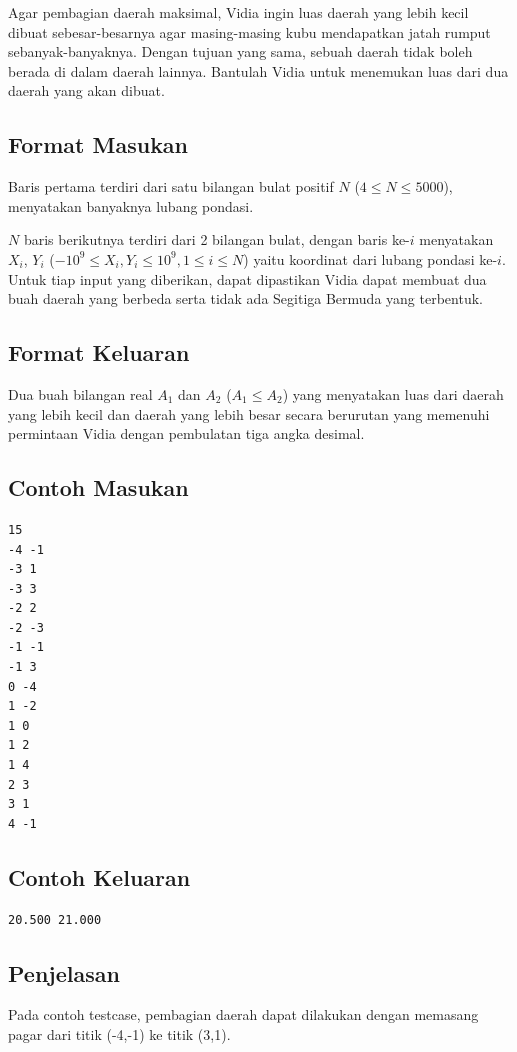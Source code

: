\documentclass{article}
\begin{document}
Agar pembagian daerah maksimal, Vidia ingin luas daerah yang lebih kecil dibuat sebesar-besarnya agar masing-masing kubu mendapatkan jatah rumput sebanyak-banyaknya. Dengan tujuan yang sama, sebuah daerah tidak boleh berada di dalam daerah lainnya. Bantulah Vidia untuk menemukan luas dari dua daerah yang akan dibuat.

\subsection*{Format Masukan}
Baris pertama terdiri dari satu bilangan bulat positif $N$ ($4 \leq N \leq 5000$), menyatakan banyaknya lubang pondasi.

$N$ baris berikutnya terdiri dari 2 bilangan bulat, dengan baris ke-$i$ menyatakan $X_i$, $Y_i$ ($-10^9 \leq X_i, Y_i \leq 10^9, 1 \leq i \leq N$) yaitu koordinat dari lubang pondasi ke-$i$. Untuk tiap input yang diberikan, dapat dipastikan Vidia dapat membuat dua buah daerah yang berbeda serta tidak ada Segitiga Bermuda yang terbentuk.

\subsection*{Format Keluaran}
Dua buah bilangan real $A_1$ dan $A_2$ ($A_1 \leq A_2$) yang menyatakan luas dari daerah yang lebih kecil dan daerah yang lebih besar secara berurutan yang memenuhi permintaan Vidia dengan pembulatan tiga angka desimal. 

\pagebreak
\begin{multicols}{2}
\subsection*{Contoh Masukan}
\begin{lstlisting}
15
-4 -1
-3 1
-3 3
-2 2
-2 -3
-1 -1
-1 3
0 -4
1 -2
1 0
1 2
1 4
2 3
3 1
4 -1
\end{lstlisting}
\columnbreak
\subsection*{Contoh Keluaran}
\begin{lstlisting}
20.500 21.000
\end{lstlisting}
\vfill
\null
\end{multicols}

\subsection*{Penjelasan}
Pada contoh testcase, pembagian daerah dapat dilakukan dengan memasang pagar dari titik (-4,-1) ke titik (3,1).
\end{document}
